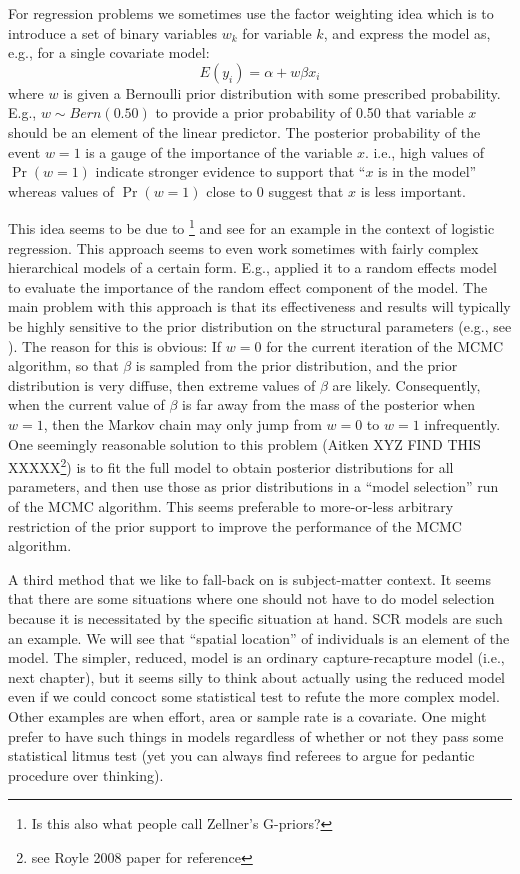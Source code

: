 For regression problems we sometimes use the factor weighting idea
which is to introduce a set of binary variables $w_{k}$ for variable
$k$, and express the model as, e.g., for a single covariate model:
 \[
 E(y_i) = \alpha + w \beta x_{i}
\]
where $w$ is given a Bernoulli prior distribution with some prescribed
probability. E.g., $w \sim Bern(0.50)$ to provide a prior probability
of 0.50 that variable $x$ should be an element of the linear
predictor. The posterior probability of the event $w=1$ is a gauge of
the importance of the variable $x$. i.e., high values of $\Pr(w=1)$
indicate stronger evidence to support that ``$x$ is in the model''
whereas values of $\Pr(w=1)$ close to 0 suggest that $x$ is less
important.

 

This idea seems to be due to \citet{kuo_mallick:1998}\footnote{ Is
  this also what people call Zellner's G-priors?} and see
\citet[][ch. XXXX]{royle_dorazio:2008} for an example in the context
of logistic regression. This approach seems to even work sometimes
with fairly complex hierarchical models of a certain form. E.g.,
\citet{royle:2008} applied it to a random effects model to evaluate
the importance of the random effect component of the model.  The main
problem with this approach is that its effectiveness and results will
typically be highly sensitive to the prior distribution on the
structural parameters (e.g., see \citet[][table xyz]{royle_dorazio:2008}).
The reason for this is obvious: If $w = 0$ for the current
iteration of the MCMC algorithm, so that $\beta$ is sampled from the
prior distribution, and the prior distribution is very diffuse, then
extreme values of $\beta$ are likely. Consequently, when the current value of
$\beta$ is 
far away from the mass of the posterior when $w=1$, then the Markov
chain may only jump from $w=0$ to $w=1$ infrequently.  One seemingly
reasonable solution to this problem (Aitken XYZ FIND THIS
XXXXX\footnote{see Royle 2008 paper for reference}) is to fit the full
model to obtain posterior distributions for all parameters, and then
use those as prior distributions in a ``model selection'' run of the
MCMC algorithm.  This seems preferable to more-or-less arbitrary restriction of
the prior support to improve the performance of the MCMC algorithm.

A third method that we like to fall-back on is subject-matter
context. It seems that there are some situations where one should not
have to do model selection because it is necessitated by the specific
situation at hand. SCR models are such an example. We will see that
``spatial location'' of individuals is an element of the model. The
simpler, reduced, model is an ordinary capture-recapture model (i.e.,
next chapter), but it seems silly to think about actually using the
reduced model even if we could concoct some statistical test to refute
the more complex model.  Other examples are when effort, area or
sample rate is a covariate. One might prefer to have such things in
models regardless of whether or not they pass some statistical litmus
test (yet you can always find referees to argue for pedantic procedure
over thinking).

